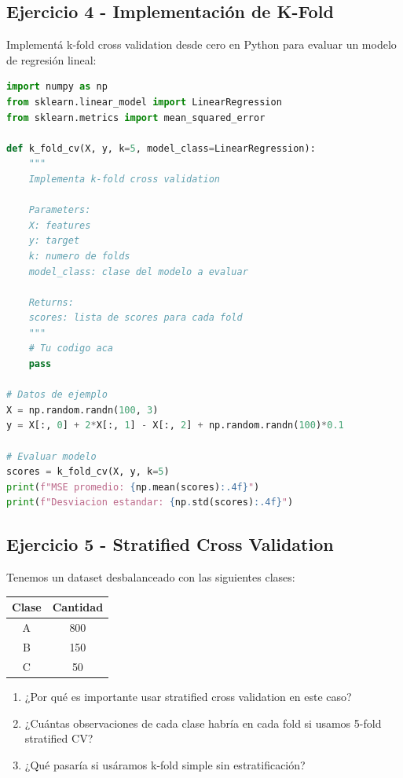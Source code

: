 \documentclass[12pt]{article}
\begin{document}
\subsection{Ejercicio 4 - Implementación de K-Fold}

Implementá k-fold cross validation desde cero en Python para evaluar un modelo de regresión lineal:

\begin{lstlisting}[language=Python]
import numpy as np
from sklearn.linear_model import LinearRegression
from sklearn.metrics import mean_squared_error

def k_fold_cv(X, y, k=5, model_class=LinearRegression):
    """
    Implementa k-fold cross validation
    
    Parameters:
    X: features
    y: target
    k: numero de folds
    model_class: clase del modelo a evaluar
    
    Returns:
    scores: lista de scores para cada fold
    """
    # Tu codigo aca
    pass

# Datos de ejemplo
X = np.random.randn(100, 3)
y = X[:, 0] + 2*X[:, 1] - X[:, 2] + np.random.randn(100)*0.1

# Evaluar modelo
scores = k_fold_cv(X, y, k=5)
print(f"MSE promedio: {np.mean(scores):.4f}")
print(f"Desviacion estandar: {np.std(scores):.4f}")
\end{lstlisting}

\subsection{Ejercicio 5 - Stratified Cross Validation}

Tenemos un dataset desbalanceado con las siguientes clases:

\begin{table}[H]
    \centering
    \begin{tabular}{cc}
        \toprule
        \textbf{Clase} & \textbf{Cantidad} \\
        \midrule
        A & 800 \\
        B & 150 \\
        C & 50 \\
        \bottomrule
    \end{tabular}
\end{table}

\begin{enumerate}
    \item ¿Por qué es importante usar stratified cross validation en este caso?
    \item ¿Cuántas observaciones de cada clase habría en cada fold si usamos 5-fold stratified CV?
    \item ¿Qué pasaría si usáramos k-fold simple sin estratificación?
\end{enumerate}
\end{document}
